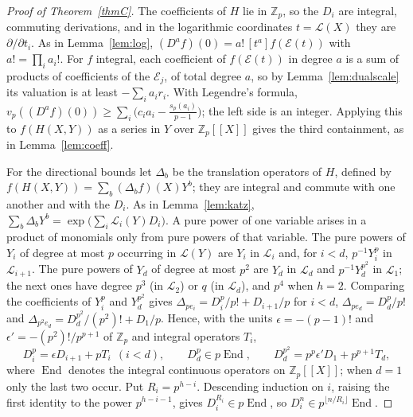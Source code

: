 \documentclass[11pt]{amsart}
\theoremstyle{definition}
\theoremstyle{remark}
\newcommand{\Z}{\mathbb Z}
\newcommand{\vp}{v_p}
\DeclareMathOperator{\End}{End}
\begin{document}
\begin{proof}[Proof of Theorem~\ref{thmC}]
The coefficients of $H$ lie in $\Z_p$, so the $D_i$ are integral, commuting derivations, and in the logarithmic coordinates $t=\mathcal L(X)$ they are $\partial/\partial t_i$. As in Lemma~\ref{lem:log}, $(D^af)(0)=a!\,[t^a]f(\mathcal E(t))$ with $a!=\prod_ia_i!$. For $f$ integral, each coefficient of $f(\mathcal E(t))$ in degree $a$ is a sum of products of coefficients of the $\mathcal E_j$, of total degree $a$, so by Lemma~\ref{lem:dualscale} its valuation is at least $-\sum_ia_ir_i$. With Legendre's formula, $\vp((D^af)(0))\ge\sum_i\bigl(c_ia_i-\frac{s_p(a_i)}{p-1}\bigr)$; the left side is an integer. Applying this to $f(H(X,Y))$ as a series in $Y$ over $\Z_p[[X]]$ gives the third containment, as in Lemma~\ref{lem:coeff}.

For the directional bounds let $\Delta_b$ be the translation operators of $H$, defined by $f(H(X,Y))=\sum_b(\Delta_bf)(X)Y^b$; they are integral and commute with one another and with the $D_i$. As in Lemma~\ref{lem:katz}, $\sum_b\Delta_bY^b=\exp\bigl(\sum_i\mathcal L_i(Y)D_i\bigr)$. A pure power of one variable arises in a product of monomials only from pure powers of that variable. The pure powers of $Y_i$ of degree at most $p$ occurring in $\mathcal L(Y)$ are $Y_i$ in $\mathcal L_i$ and, for $i<d$, $p^{-1}Y_i^p$ in $\mathcal L_{i+1}$. The pure powers of $Y_d$ of degree at most $p^2$ are $Y_d$ in $\mathcal L_d$ and $p^{-1}Y_d^{p^2}$ in $\mathcal L_1$; the next ones have degree $p^3$ (in $\mathcal L_2$) or $q$ (in $\mathcal L_d$), and $p^4$ when $h=2$. Comparing the coefficients of $Y_i^p$ and $Y_d^{p^2}$ gives $\Delta_{pe_i}=D_i^p/p!+D_{i+1}/p$ for $i<d$, $\Delta_{pe_d}=D_d^p/p!$ and $\Delta_{p^2e_d}=D_d^{p^2}/(p^2)!+D_1/p$. Hence, with the units $\epsilon=-(p-1)!$ and $\epsilon'=-(p^2)!/p^{p+1}$ of $\Z_p$ and integral operators $T_i$,
\begin{equation}\label{eq:duallow}
 D_i^p=\epsilon D_{i+1}+pT_i\ \ (i<d),\qquad D_d^p\in p\End,\qquad D_d^{p^2}=p^p\epsilon'D_1+p^{p+1}T_d,
\end{equation}
where $\End$ denotes the integral continuous operators on $\Z_p[[X]]$; when $d=1$ only the last two occur. Put $R_i=p^{h-i}$. Descending induction on $i$, raising the first identity to the power $p^{h-i-1}$, gives $D_i^{R_i}\in p\End$, so $D_i^n\in p^{\lfloor n/R_i\rfloor}\End$.


\end{proof}
\end{document}
